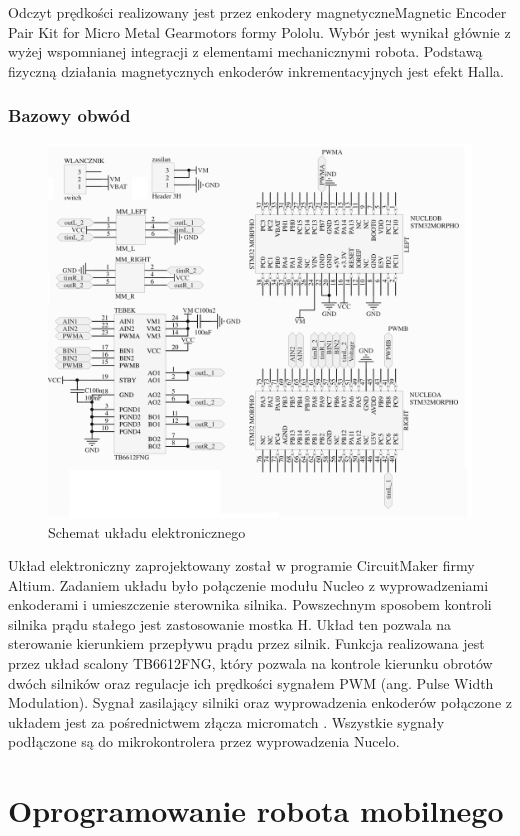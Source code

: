 \documentclass[eng,printmode]{mgr}
\begin{document}
Odczyt prędkości realizowany jest przez enkodery magnetyczneMagnetic Encoder Pair Kit for Micro Metal Gearmotors formy Pololu. Wybór jest wynikał głównie z wyżej wspomnianej integracji z elementami mechanicznymi robota. Podstawą fizyczną działania magnetycznych enkoderów inkrementacyjnych jest efekt Halla.

   \subsection{Bazowy obwód}
   \begin{figure}[ht]
    \centering
    \includegraphics[width=12cm]{images/schemat_elekt}
    \caption{Schemat układu elektronicznego}
    \label{fig:schemat_elekt}
   \end{figure}

Układ elektroniczny zaprojektowany został w programie CircuitMaker firmy Altium. Zadaniem układu było połączenie modułu Nucleo z wyprowadzeniami enkoderami i umieszczenie sterownika silnika. Powszechnym sposobem kontroli silnika prądu stałego jest zastosowanie mostka H. Układ ten pozwala na sterowanie kierunkiem przepływu prądu przez silnik. Funkcja realizowana jest przez układ scalony TB6612FNG, który pozwala na kontrole kierunku obrotów dwóch silników oraz regulacje ich prędkości sygnałem PWM (ang. Pulse Width Modulation). Sygnał zasilający silniki oraz wyprowadzenia enkoderów połączone z układem jest za pośrednictwem złącza micromatch . Wszystkie sygnały podłączone są do mikrokontrolera przez wyprowadzenia Nucelo.
 
\chapter{Oprogramowanie robota mobilnego}
\end{document}
